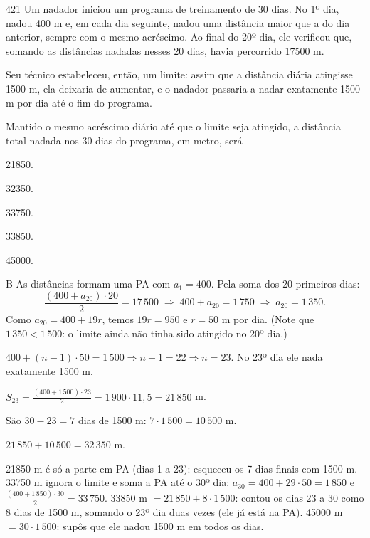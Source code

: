 \begin{questaoinedita}{4}{21}
Um nadador iniciou um programa de treinamento de 30 dias. No 1º dia, nadou
400 m e, em cada dia seguinte, nadou uma distância maior que a do dia
anterior, sempre com o mesmo acréscimo. Ao final do 20º dia, ele verificou que,
somando as distâncias nadadas nesses 20 dias, havia percorrido
\num{17500} m.

Seu técnico estabeleceu, então, um limite: assim que a distância diária
atingisse \num{1500} m, ela deixaria de aumentar, e o nadador passaria a nadar
exatamente \num{1500} m por dia até o fim do programa.

Mantido o mesmo acréscimo diário até que o limite seja atingido, a distância
total nadada nos 30 dias do programa, em metro, será
\begin{alternativas*}[5]
  \item \num{21850}.
  \item \num{32350}.
  \item \num{33750}.
  \item \num{33850}.
  \item \num{45000}.
\end{alternativas*}
\end{questaoinedita}
\begin{resolucao}{B}
 As distâncias formam
uma PA com $a_1 = 400$. Pela soma dos 20 primeiros dias:
\[
\frac{(400 + a_{20})\cdot 20}{2} = 17\,500 \;\Rightarrow\; 400 + a_{20} = 1\,750
\;\Rightarrow\; a_{20} = 1\,350 .
\]
Como $a_{20} = 400 + 19r$, temos $19r = 950$ e $r = 50$ m por dia. (Note que
$1\,350 < 1\,500$: o limite ainda não tinha sido atingido no 20º dia.)

$400 + (n - 1)\cdot 50 = 1\,500 \Rightarrow n - 1 = 22 \Rightarrow n = 23$.
No 23º dia ele nada exatamente \num{1500} m.

$S_{23} = \frac{(400 + 1\,500)\cdot 23}{2} = 1\,900 \cdot 11{,}5 = 21\,850$ m.

 São $30 - 23 = 7$ dias de \num{1500} m:
$7 \cdot 1\,500 = 10\,500$ m.

 $21\,850 + 10\,500 = 32\,350$ m.


\begin{distratores}
 \num{21850} m é só a parte em PA (dias 1 a 23): esqueceu os 7 dias
finais com \num{1500} m.
 \num{33750} m ignora o limite e soma a PA até o 30º dia:
$a_{30} = 400 + 29 \cdot 50 = 1\,850$ e $\frac{(400 + 1\,850)\cdot 30}{2} = 33\,750$.
 \num{33850} m $= 21\,850 + 8 \cdot 1\,500$: contou os dias 23 a 30 como
8 dias de \num{1500} m, somando o 23º dia duas vezes (ele já está na PA).
 \num{45000} m $= 30 \cdot 1\,500$: supôs que ele nadou \num{1500} m em
todos os dias.
\end{distratores}
\end{resolucao}
